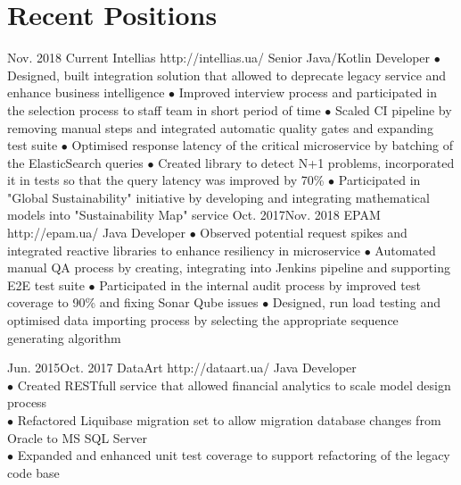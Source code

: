 \documentclass[10pt]{article} %
\begin{document}
\section{Recent Positions}
\job
{Nov. 2018 }{ Current}
{Intellias}
{http://intellias.ua/}
{Senior Java/Kotlin Developer}
{
\textbf{}   \newline
$\bullet$ Designed, built integration solution that allowed to deprecate legacy service and enhance business intelligence\newline
$\bullet$ Improved interview process and participated in the selection process to staff team in short period of time \newline
$\bullet$ Scaled CI pipeline by removing manual steps and integrated automatic quality gates and expanding test suite \newline
$\bullet$ Optimised response latency of the critical microservice by batching of the ElasticSearch queries \newline
$\bullet$ Created library to detect N+1 problems, incorporated it in tests so that the query latency was improved by 70\% \newline
$\bullet$ Participated in "Global Sustainability" initiative by developing and integrating mathematical models into "Sustainability Map" service
 }
\job
{Oct. 2017}{Nov. 2018}
{EPAM}
{http://epam.ua/}
{Java Developer}
{
\textbf{}    \newline
$\bullet$ Observed potential request spikes and integrated reactive libraries to enhance resiliency in microservice\newline
$\bullet$ Automated manual QA process by creating, integrating into Jenkins pipeline and supporting E2E test suite\newline
$\bullet$ Participated in the internal audit process by improved test coverage to 90\% and fixing Sonar Qube issues\newline
$\bullet$ Designed, run load testing and optimised data importing process by selecting the appropriate sequence generating algorithm
 }

\job
{Jun. 2015}{Oct. 2017}
{DataArt}
{http://dataart.ua/}
{Java Developer}
{
\textbf{}  
\\$\bullet$ Created RESTfull service that allowed financial analytics to scale model design process 
\\$\bullet$ Refactored Liquibase migration set to allow migration database changes from Oracle to MS SQL Server
\\$\bullet$ Expanded and enhanced unit test coverage to support refactoring of the legacy code base
 }
\end{document}
